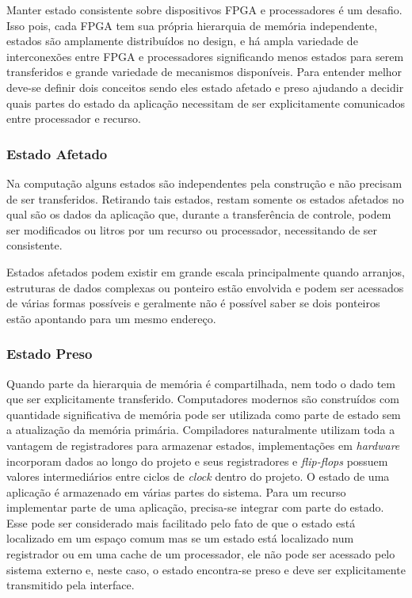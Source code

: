 Manter estado consistente sobre dispositivos FPGA e processadores é um desafio. Isso pois, cada FPGA tem sua própria hierarquia de memória independente, estados são amplamente distribuídos no design, e há ampla variedade de interconexões entre FPGA e processadores significando menos estados para serem transferidos e grande variedade de mecanismos disponíveis. Para entender melhor deve-se definir dois conceitos sendo eles estado afetado e preso ajudando a decidir quais partes do estado da aplicação necessitam de ser explicitamente comunicados entre processador e recurso.



\subsubsection{Estado Afetado}

Na computação alguns estados são independentes pela construção e não precisam de ser transferidos. Retirando tais estados, restam somente os estados afetados no qual são os dados da aplicação que, durante a transferência de controle, podem ser modificados ou litros por um recurso ou processador, necessitando de ser consistente.



Estados afetados podem existir em grande escala principalmente quando arranjos, estruturas de dados complexas ou ponteiro estão envolvida e podem ser acessados de várias formas possíveis e geralmente não é possível saber se dois ponteiros estão apontando para um mesmo endereço.



\subsubsection{Estado Preso}

Quando parte da hierarquia de memória é compartilhada, nem todo o dado tem que ser explicitamente transferido. Computadores modernos são construídos com quantidade significativa de memória pode ser utilizada como parte de estado sem a atualização da memória primária. Compiladores naturalmente utilizam toda a vantagem de registradores para armazenar estados, implementações em \textit{hardware} incorporam dados ao longo do projeto e seus registradores e \textit{flip-flops} possuem valores intermediários entre ciclos de \textit{clock} dentro do projeto. O estado de uma aplicação é armazenado em várias partes do sistema. Para um recurso implementar parte de uma aplicação, precisa-se integrar com parte do estado. Esse pode ser considerado mais facilitado pelo fato de que o estado está localizado em um espaço comum mas se um estado está localizado num registrador ou em uma cache de um processador, ele não pode ser acessado pelo sistema externo e, neste caso, o estado encontra-se preso e deve ser explicitamente transmitido pela interface.



